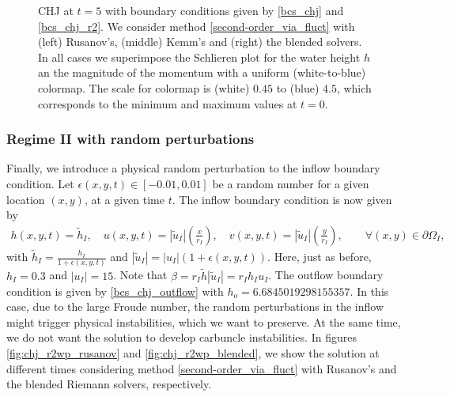 \documentclass[preprint, 11pt]{article}
\newcommand{\bfu}{{u}}
\begin{document}
\begin{figure}[!h]
{  }
  \caption{CHJ at $t=5$ with boundary conditions given by \eqref{bcs_chj} and \eqref{bcs_chj_r2}. 
    We consider method \eqref{second-order_via_fluct} with (left) Rusanov's,
    (middle) Kemm's and (right) the blended solvers. 
    In all cases we superimpose the Schlieren plot for the water height $h$
    an the magnitude of the momentum with a uniform (white-to-blue) colormap. 
    The scale for colormap is (white) $0.45$ to (blue) $4.5$, 
    which corresponds to the minimum and maximum values at $t=0$.
    \label{fig:chj_r2_later}}
\end{figure}

\subsubsection{Regime II with random perturbations}
Finally, we introduce a physical random perturbation to the inflow boundary condition.
Let $\epsilon(x,y,t)\in[-0.01,0.01]$ be a random number for a given location $(x,y)$,
at a given time $t$. 
The inflow boundary condition is now given by
\begin{subequations}
  \begin{align}
    h(x,y,t)=\tilde h_I, \quad
    u(x,y,t)=|\tilde \bfu_I| \left(\frac{x}{r_I}\right), \quad
    v(x,y,t)=|\tilde \bfu_I| \left(\frac{y}{r_I}\right), \qquad \forall (x,y)\in\partial\Omega_I,
  \end{align}
\end{subequations}
with $\tilde h_I = \frac{h_I}{1+\epsilon(x,y,t)}$ and $|\tilde\bfu_I|=|\bfu_I|(1+\epsilon(x,y,t))$.
Here, just as before, $h_I=0.3$ and $|\bfu_I|=15$. 
Note that $\beta=r_I\tilde h|\tilde\bfu_I|=r_Ih_I\bfu_I$.
The outflow boundary condition is given by
\eqref{bcs_chj_outflow} with $h_o=6.6845019298155357$.
In this case, due to the large Froude number, the random perturbations in the inflow
might trigger physical instabilities, which we want to preserve. At the same time, we
do not want the solution to develop carbuncle instabilities.
In figures \ref{fig:chj_r2wp_rusanov} and \ref{fig:chj_r2wp_blended}, we show the solution
at different times considering method \eqref{second-order_via_fluct} with Rusanov's and
the blended Riemann solvers, respectively. 
\end{document}
